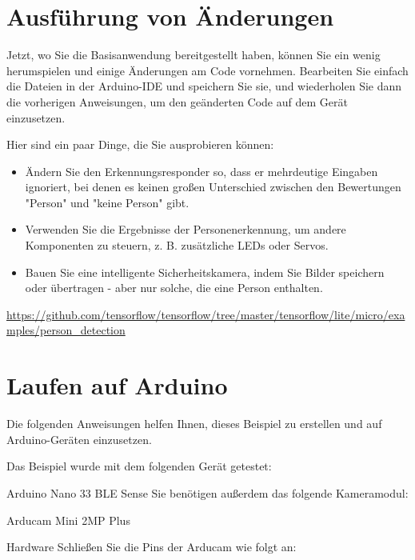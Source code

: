 \section{Ausführung von Änderungen}

Jetzt, wo Sie die Basisanwendung bereitgestellt haben, können Sie ein wenig herumspielen und einige Änderungen am Code vornehmen. Bearbeiten Sie einfach die Dateien in der Arduino-IDE und speichern Sie sie, und wiederholen Sie dann die vorherigen Anweisungen, um den geänderten Code auf dem Gerät einzusetzen.

Hier sind ein paar Dinge, die Sie ausprobieren können:

\begin{itemize}
  \item Ändern Sie den Erkennungsresponder so, dass er mehrdeutige Eingaben ignoriert, bei denen es keinen großen Unterschied zwischen den Bewertungen "Person" und "keine Person" gibt.
\item Verwenden Sie die Ergebnisse der Personenerkennung, um andere Komponenten zu steuern, z. B. zusätzliche LEDs oder Servos.
\item Bauen Sie eine intelligente Sicherheitskamera, indem Sie Bilder speichern oder übertragen - aber nur solche, die eine Person enthalten.
\end{itemize}















\cite{Chowdhery:2019}


\url{https://github.com/tensorflow/tensorflow/tree/master/tensorflow/lite/micro/examples/person\_detection}

\section{Laufen auf Arduino}

Die folgenden Anweisungen helfen Ihnen, dieses Beispiel zu erstellen und auf Arduino-Geräten einzusetzen.

Das Beispiel wurde mit dem folgenden Gerät getestet:

Arduino Nano 33 BLE Sense
Sie benötigen außerdem das folgende Kameramodul:

Arducam Mini 2MP Plus

Hardware
Schließen Sie die Pins der Arducam wie folgt an:

